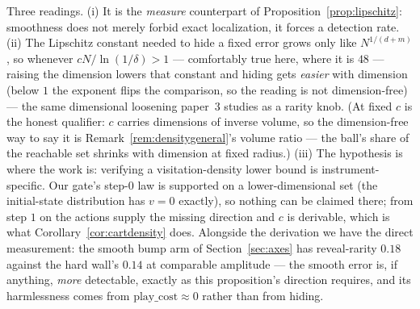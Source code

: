 \documentclass[11pt]{article}
\theoremstyle{definition}
\theoremstyle{remark}
\begin{document}
Three readings. (i) It is the \emph{measure} counterpart of Proposition~\ref{prop:lipschitz}: smoothness does not merely forbid exact localization, it forces a detection rate. (ii) The Lipschitz constant needed to hide a fixed error grows only like $N^{1/(d+m)}$, so whenever $cN/\ln(1/\delta) > 1$ --- comfortably true here, where it is $48$ --- raising the dimension lowers that constant and hiding gets \emph{easier} with dimension (below $1$ the exponent flips the comparison, so the reading is not dimension-free) --- the same dimensional loosening paper~3 studies as a rarity knob. (At fixed $c$ is the honest qualifier: $c$ carries dimensions of inverse volume, so the dimension-free way to say it is Remark~\ref{rem:densitygeneral}'s volume ratio --- the ball's share of the reachable set shrinks with dimension at fixed radius.) (iii) The hypothesis is where the work is: verifying a visitation-density lower bound is instrument-specific. Our gate's step-$0$ law is supported on a lower-dimensional set (the initial-state distribution has $v = 0$ exactly), so nothing can be claimed there; from step $1$ on the actions supply the missing direction and $c$ is derivable, which is what Corollary~\ref{cor:cartdensity} does. Alongside the derivation we have the direct measurement: the smooth bump arm of Section~\ref{sec:axes} has reveal-rarity $0.18$ against the hard wall's $0.14$ at comparable amplitude --- the smooth error is, if anything, \emph{more} detectable, exactly as this proposition's direction requires, and its harmlessness comes from $\mathrm{play\_cost} \approx 0$ rather than from hiding.
\end{document}
